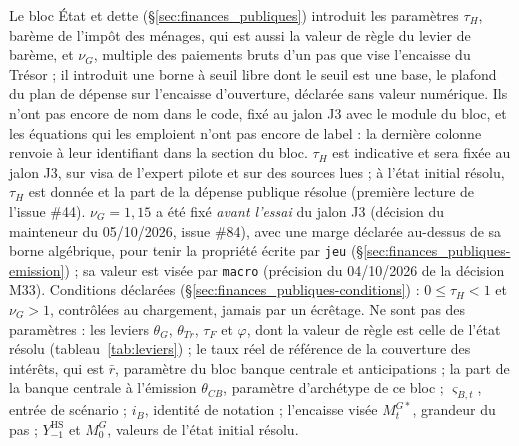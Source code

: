\documentclass[11pt,a4paper]{article}
\begin{document}
\begin{proposee}
Le bloc État et dette (\S\ref{sec:finances_publiques}) introduit les paramètres $\tau_H$, barème de l'impôt des ménages, qui est aussi la valeur de règle du levier de barème, et $\nu_G$, multiple des paiements bruts d'un pas que vise l'encaisse du Trésor ; il introduit une borne à seuil libre dont le seuil est une base, le plafond du plan de dépense sur l'encaisse d'ouverture, déclarée sans valeur numérique. Ils n'ont pas encore de nom dans le code, fixé au jalon J3 avec le module du bloc, et les équations qui les emploient n'ont pas encore de label : la dernière colonne renvoie à leur identifiant dans la section du bloc. $\tau_H$ est indicative et sera fixée au jalon J3, sur visa de l'expert pilote et sur des sources lues ; à l'état initial résolu, $\tau_H$ est donnée et la part de la dépense publique résolue (première lecture de l'issue \#44). $\nu_G = 1{,}15$ a été fixé \emph{avant l'essai} du jalon J3 (décision du mainteneur du 05/10/2026, issue \#84), avec une marge déclarée au-dessus de sa borne algébrique, pour tenir la propriété écrite par \texttt{jeu} (\S\ref{sec:finances_publiques-emission}) ; sa valeur est visée par \texttt{macro} (précision du 04/10/2026 de la décision M33). Conditions déclarées (\S\ref{sec:finances_publiques-conditions}) : $0 \le \tau_H < 1$ et $\nu_G > 1$, contrôlées au chargement, jamais par un écrêtage. Ne sont pas des paramètres : les leviers $\theta_G$, $\theta_{\mathit{Tr}}$, $\tau_F$ et $\varphi$, dont la valeur de règle est celle de l'état résolu (tableau~\ref{tab:leviers}) ; le taux réel de référence de la couverture des intérêts, qui est $\bar r$, paramètre du bloc banque centrale et anticipations ; la part de la banque centrale à l'émission $\theta_{\mathit{CB}}$, paramètre d'archétype de ce bloc ; $\varsigma_{B,t}$, entrée de scénario ; $i_B$, identité de notation ; l'encaisse visée $M^{G*}_t$, grandeur du pas ; $Y^{\mathrm{HS}}_{-1}$ et $M^G_0$, valeurs de l'état initial résolu.
\end{proposee}
\end{document}
